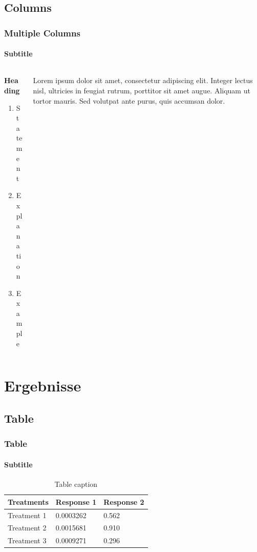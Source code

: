 \documentclass[
	11pt, %
	aspectratio=169, %
]{beamer}
\begin{document}

\subsection{Columns}

\begin{frame}
	\frametitle{Multiple Columns}
	\framesubtitle{Subtitle} %
	
	\begin{columns}[c] %
		\begin{column}{0.45\textwidth} %
			\textbf{Heading}
			\begin{enumerate}
				\item Statement
				\item Explanation
				\item Example
			\end{enumerate}
		\end{column}
		\begin{column}{0.5\textwidth} %
			Lorem ipsum dolor sit amet, consectetur adipiscing elit. Integer lectus nisl, ultricies in feugiat rutrum, porttitor sit amet augue. Aliquam ut tortor mauris. Sed volutpat ante purus, quis accumsan dolor.
		\end{column}
	\end{columns}
\end{frame}


\section{Ergebnisse}

\subsection{Table}

\begin{frame}
	\frametitle{Table}
	\framesubtitle{Subtitle} %
	
	\begin{table}
		\begin{tabular}{l l l}
			\toprule
			\textbf{Treatments} & \textbf{Response 1} & \textbf{Response 2}\\
			\midrule
			Treatment 1 & 0.0003262 & 0.562 \\
			Treatment 2 & 0.0015681 & 0.910 \\
			Treatment 3 & 0.0009271 & 0.296 \\
			\bottomrule
		\end{tabular}
		\caption{Table caption}
	\end{table}
\end{frame}
\end{document}
